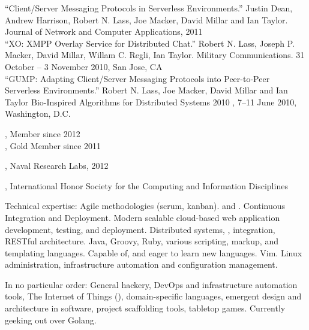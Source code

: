 \documentclass[10pt,a4paper]{article}
\begin{document}
\noindent ``Client/Server Messaging Protocols in Serverless Environments.'' Justin Dean, Andrew Harrison, Robert N. Lass, Joe Macker, David Millar and Ian Taylor. Journal of Network and Computer Applications, 2011 \\

\noindent ``XO: XMPP Overlay Service for Distributed Chat.'' Robert N. Lass, Joseph P. Macker, David Millar, Willam C. Regli, Ian Taylor. Military Communications. 31 October -- 3 November 2010, San Jose, CA \\

\noindent ``GUMP: Adapting Client/Server Messaging Protocols into Peer-to-Peer Serverless Environments.'' Robert N. Lass, Joe Macker, David Millar and Ian Taylor Bio-Inspired Algorithms for Distributed Systems 2010 , 7--11 June 2010, Washington, D.C. \\

\vspace{0.5em}
\spacedhrule{0.5em}{-0.4em}



\noindent{}, Member since 2012 \\
\noindent{}, Gold Member since 2011 \\
\vspace{0.5em}
\spacedhrule{0.5em}{-0.4em}


, Naval Research Labs, 2012

\noindent{}, International Honor Society for the Computing and Information Disciplines
\vspace{0.5em}
\spacedhrule{0.5em}{-0.4em}


\inlineheadsection  %
  {Technical expertise:}
  {
    Agile methodologies (scrum, kanban).
     and .
    Continuous Integration and Deployment.
    Modern scalable cloud-based web application development, testing, and deployment.
    Distributed systems, , integration, RESTful architecture.
    Java, Groovy, Ruby, various scripting, markup, and templating languages.  Capable of, and eager to learn new languages.
    Vim. Linux administration, infrastructure automation and configuration management.
  }

\spacedhrule{1.6em}{-0.4em}

\inlineheadsection
  {In no particular order:}
  {
    General hackery, DevOps and infrastructure automation tools,
    The Internet of Things (),
    domain-specific languages,
    emergent design and architecture in software,
    project scaffolding tools,
    tabletop games.
    Currently geeking out over Golang.
  }
\end{document}
